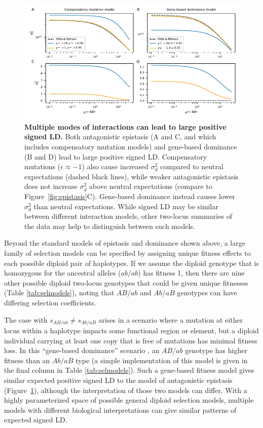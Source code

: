 \documentclass[]{article}
\begin{document}
\begin{figure}[tb!]
    \centering
    \includegraphics{../figures/gene-based-compensatory}
    \caption{
        \textbf{Multiple modes of interactions can lead to large positive signed LD.}
        Both antagonistic epistasis (A and C, and which includes compensatory mutation
        models) and gene-based dominance (B and D) lead to large positive signed LD.
        Compensatory mutations (\(\epsilon \approx -1\)) also cause increased
        \(\sigma_d^2\) compared to neutral expectations (dashed black lines),
        while weaker antagonistic epistasis does not increase \(\sigma_d^2\) above
        neutral expectations (compare to Figure~\ref{fig:epistasis}C).
        Gene-based dominance instead causes lower \(\sigma_d^2\) than neutral
        expectations.
        While signed LD may be similar between different interaction models,
        other two-locus summaries of the data may help to distinguish between
        such models.
        }
    \label{fig:gene-based-compensatory}
\end{figure}

Beyond the standard models of epistasis and dominance shown above, a large
family of selection models can be specified by assigning unique fitness effects
to each possible diploid pair of haplotypes. If we assume the diploid genotype
that is homozygous for the ancestral alleles (\(ab/ab\)) has fitness 1, then
there are nine other possible diploid two-locus genotypes that could be given
unique fitnesses (Table \ref{tab:selmodels}), noting that \(AB/ab\) and
\(Ab/aB\) genotypes can have differing selection coefficients.

The case with \(s_{AB/ab} \not= s_{Ab/aB}\) arises in a scenario where a
mutation at either locus within a haplotype impacts some functional region or
element, but a diploid individual carrying at least one copy that is free of
mutations has minimal fitness loss. In this ``gene-based dominance'' scenario
\citep[e.g.,][]{Sanjak2017-zw}, an \(AB/ab\) genotype has higher fitness than
an \(Ab/aB\) type (a simple implementation of this model is given in the final
column in Table \ref{tab:selmodels}). Such a gene-based fitness model gives
similar expected positive signed LD to the model of antagonistic epistasis
(Figure~\ref{fig:gene-based-compensatory}), although the interpretation of
those two models can differ. With a highly parameterized space of possible
general diploid selection models, multiple models with different biological
interpretations can give similar patterns of expected signed LD.
\end{document}
